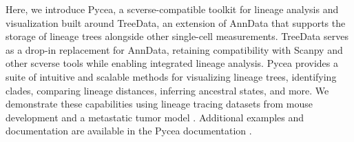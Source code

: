 Here, we introduce Pycea, a scverse-compatible toolkit for lineage analysis and visualization built around TreeData, an extension of AnnData that supports the storage of lineage trees alongside other single-cell measurements. TreeData serves as a drop-in replacement for AnnData, retaining compatibility with Scanpy and other scverse tools while enabling integrated lineage analysis. Pycea provides a suite of intuitive and scalable methods for visualizing lineage trees, identifying clades, comparing lineage distances, inferring ancestral states, and more. We demonstrate these capabilities using lineage tracing datasets from mouse development and a metastatic tumor model \citep{colgan2026,koblan2025}. Additional examples and documentation are available in the Pycea documentation \citep{pycea_docs}.
